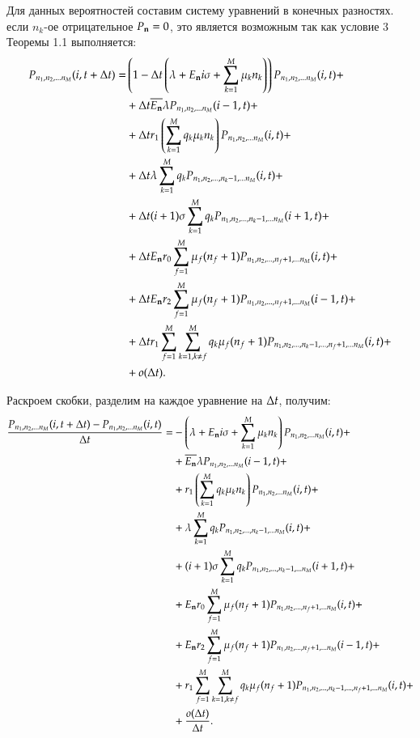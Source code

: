 Для данных вероятностей составим систему уравнений в конечных разностях. 
если \(n_k\)-ое отрицательное \(P_{\bold{n}} = 0\),
это является возможным так как условие 3 Теоремы 1.1 выполняется: 
\begin{equation*}\begin{aligned}   
{P}_{{n}_1, {n}_2, ... {n}_{M}}(i,t+\Delta t)= 
    &\left( {1-\Delta t\left( {\lambda + E_{\bold{n}} i \sigma+\sum_{{k}=1}^{M}\mu_{k}{n}_{k}} \right)} \right)
        {P}_{{n}_1, {n}_2, ... {n}_{M}}(i,t)+\\
    &+\Delta t \overline{E_{\bold{n}}} \lambda {P}_{{n}_1, {n}_2, ... {n}_{M}}(i-1,t)+\\
    &+\Delta t r_1 \left( {\sum_{{k}=1}^{M} q_{k}\mu_{k}{n}_{k}} \right) {P}_{{n}_1, {n}_2, ... {n}_{M}}(i,t) + \\
    &+\Delta t \lambda\sum_{k=1}^{M}q_k {P}_{{n}_1, {n}_2, ... , {n}_{k} - 1, ... {n}_{M}}(i,t) + \\
    &+\Delta t (i+1)\sigma\sum_{k=1}^{M}q_k {P}_{{n}_1, {n}_2, ... , {n}_{k} - 1, ... {n}_{M}}(i+1,t) + \\
    &+\Delta t E_{\bold{n}} r_0 \sum_{f=1}^{M} \mu_f (n_f + 1) {P}_{{n}_1, {n}_2, ... , {n}_{f} + 1, ... {n}_{M}}(i,t) + \\
    &+\Delta t E_{\bold{n}} r_2 \sum_{f=1}^{M} \mu_f (n_f + 1) {P}_{{n}_1, {n}_2, ... , {n}_{f} + 1, ... {n}_{M}}(i-1,t) + \\
    &+\Delta t r_1 \sum_{{f}=1}^{M} \sum_{{k}=1, {k} \neq {f}}^{M}
        q_k \mu_f (n_f+1) {P}_{{n}_1, {n}_2, ... , {n}_{k} - 1, ... , {n}_{f} + 1, ... {n}_{M}}(i,t) + \\
    &+o(\Delta t).
\end{aligned}\end{equation*}

Раскроем скобки, разделим на каждое уравнение на \(\Delta t\), получим:
\begin{equation*}\begin{aligned}
\frac{{P}_{{n}_1, {n}_2, ... {n}_{M}}(i,t+\Delta t)-{P}_{{n}_1, {n}_2, ... {n}_{M}}(i,t)}{\Delta t}= 
    &-\left( {\lambda + E_{\bold{n}} i \sigma+\sum_{{k}=1}^{M}\mu_{k}{n}_{k}} \right){P}_{{n}_1, {n}_2, ... {n}_{M}}(i,t)+\\
    &+\overline{E_{\bold{n}}} \lambda {P}_{{n}_1, {n}_2, ... {n}_{M}}(i-1,t)+\\
    &+r_1 \left( {\sum_{{k}=1}^{M} q_{k}\mu_{k}{n}_{k}} \right) {P}_{{n}_1, {n}_2, ... {n}_{M}}(i,t) + \\
    &+\lambda\sum_{k=1}^{M}q_k {P}_{{n}_1, {n}_2, ... , {n}_{k} - 1, ... {n}_{M}}(i,t) + \\
    &+(i+1)\sigma\sum_{k=1}^{M}q_k {P}_{{n}_1, {n}_2, ... , {n}_{k} - 1, ... {n}_{M}}(i+1,t) + \\
    &+E_{\bold{n}} r_0 \sum_{f=1}^{M} \mu_f (n_f + 1) {P}_{{n}_1, {n}_2, ... , {n}_{f} + 1, ... {n}_{M}}(i,t) + \\
    &+E_{\bold{n}} r_2 \sum_{f=1}^{M} \mu_f (n_f + 1) {P}_{{n}_1, {n}_2, ... , {n}_{f} + 1, ... {n}_{M}}(i-1,t) + \\
    &+r_1 \sum_{{f}=1}^{M} \sum_{{k}=1, {k} \neq {f}}^{M}
        q_k \mu_f (n_f+1) {P}_{{n}_1, {n}_2, ... , {n}_{k} - 1, ... , {n}_{f} + 1, ... {n}_{M}}(i,t) + \\
    &+\frac{o(\Delta t)}{\Delta t}.
\end{aligned}\end{equation*}

